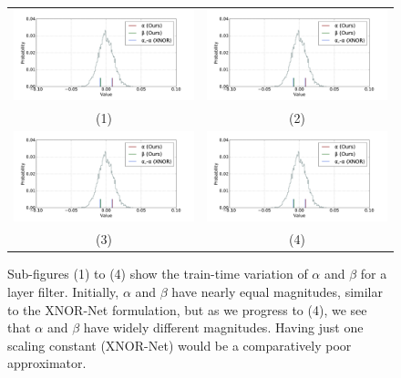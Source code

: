 \begin{figure}[t]
\begin{center}
\begin{tabular}{cc}
           \includegraphics[page=1,width=0.5\columnwidth]{figures/figure21222324.pdf} & 
           \includegraphics[page=2,width=0.5\columnwidth]{figures/figure21222324.pdf}\\
           (1) & (2)\\
           \includegraphics[page=3,width=0.5\columnwidth]{figures/figure21222324.pdf} & \includegraphics[page=4,width=0.5\columnwidth]{figures/figure21222324.pdf}\\
           (3) & (4)\\  
\end{tabular}
\end{center}
\caption{Sub-figures (1) to (4) show the train-time variation of $\alpha$ and $\beta$ for a layer filter. Initially, $\alpha$ and $\beta$ have nearly equal magnitudes, similar to the XNOR-Net formulation, but as we progress to (4), we see that $\alpha$ and $\beta$ have widely different magnitudes.%
Having just one scaling constant (XNOR-Net) would be a comparatively poor approximator.}
        \label{fig:alphabetaovertime}
\end{figure}
